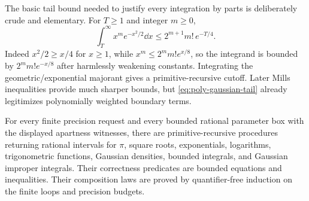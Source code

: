 The basic tail bound needed to justify every integration by parts is deliberately crude and elementary.  For $T\ge1$ and integer $m\ge0$,
\begin{equation}\label{eq:poly-gaussian-tail}
 \int_T^\infty x^m e^{-x^2/2}\dd x
 \le 2^{m+1}m!\,e^{-T/4}.
\end{equation}
Indeed $x^2/2\ge x/4$ for $x\ge1$, while $x^m\le 2^m m!e^{x/8}$, so the integrand is bounded by $2^m m!e^{-x/8}$ after harmlessly weakening constants.  Integrating the geometric/exponential majorant gives a primitive-recursive cutoff.  Later Mills inequalities provide much sharper bounds, but \eqref{eq:poly-gaussian-tail} already legitimizes polynomially weighted boundary terms.

\begin{contract}\label{con:analytic-basis}
For every finite precision request and every bounded rational parameter box with the displayed apartness witnesses, there are primitive-recursive procedures returning rational intervals for $\pi$, square roots, exponentials, logarithms, trigonometric functions, Gaussian densities, bounded integrals, and Gaussian improper integrals.  Their correctness predicates are bounded equations and inequalities.  Their composition laws are proved by quantifier-free induction on the finite loops and precision budgets.
\end{contract}

